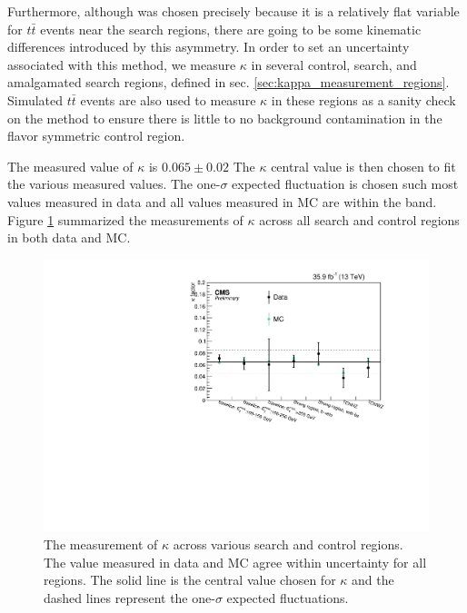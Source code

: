       Furthermore, although \mll was chosen precisely because it is a relatively flat variable for $t\bar{t}$ events near the search regions, there are going to be some kinematic differences introduced by this asymmetry. In order to set an uncertainty associated with this method, we measure $\kappa$ in several control, search, and amalgamated search regions, defined in sec. \ref{sec:kappa_measurement_regions}. Simulated $t\bar{t}$ events are also used to measure $\kappa$ in these regions as a sanity check on the method to ensure there is little to no background contamination in the flavor symmetric control region. 

      The measured value of $\kappa$ is $0.065 \pm 0.02$ The $\kappa$ central value is then chosen to fit the various measured values. The one-$\sigma$ expected fluctuation is chosen such most values measured in data and all values measured in MC are within the band. Figure \ref{fig:kappa} summarized the measurements of $\kappa$ across all search and control regions in both data and MC. 

      \begin{figure}[h!]
        \centering
        \includegraphics[width=\textwidth]{figures/datavsmc/data_summary_kfactors.pdf}
        \caption{The measurement of $\kappa$ across various search and control regions. The value measured in data and MC agree within uncertainty for all regions. The solid line is the central value chosen for $\kappa$ and the dashed lines represent the one-$\sigma$ expected fluctuations.}
        \label{fig:kappa}
      \end{figure}

      \clearpage

